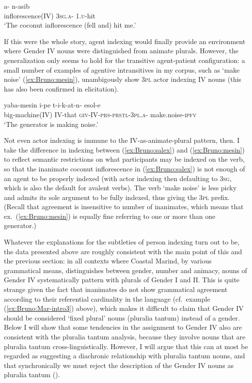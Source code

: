 \documentclass[output=collectionpaper]{langsci/langscibook}
\begin{document}
\ea\label{ex:Bruno:salex}
 a- n-asib\\
inflorescence(IV) 3\textsc{sg}.\textsc{a}- 1.\textsc{u}-hit\\
\glt `The coconut inflorescence (fell and) hit me.'
\z

\noindent If this were the whole story, agent indexing would finally provide an environment where Gender IV nouns were distinguished from animate plurals. However, the generalization only seems to hold for the transitive agent-patient configuration: a small number of examples of agentive intransitives in my corpus, such as  `make noise' (\ref{ex:Bruno:mesin}), unambigously show 3\textsc{pl} actor indexing IV nouns (this has also been confirmed in elicitation).

\ea\label{ex:Bruno:mesin}
\gll yaba-mesin i-pe t-i-k-at-n- esol-e\\
big-machine(IV) IV-that \textsc{giv}-IV-\textsc{prs}-\textsc{prstl}-3\textsc{pl}.\textsc{a}- make.noise-\textsc{ipfv} \\
\glt `The generator is making noise.'
\z

\noindent Not even actor indexing is immune to the IV-as-animate-plural pattern, then. I take the difference in indexing between (\ref{ex:Bruno:salex}) and (\ref{ex:Bruno:mesin}) to reflect semantic restrictions on what participants may be indexed on the verb, so that the inanimate coconut inflorescence in (\ref{ex:Bruno:salex}) is not enough of an agent to be properly indexed (with actor indexing then defaulting to 3\textsc{sg}, which is also the default for avalent verbs). The verb  `make noise' is less picky and admits its sole argument to be fully indexed, thus giving the 3\textsc{pl} prefix. (Recall that agreement is insensitive to number of inanimates, which means that ex.~(\ref{ex:Bruno:mesin}) is equally fine referring to one or more than one generator.)

Whatever the explanations for the subtleties of person indexing turn out to be, the data presented above are roughly consistent with the main point of this and the previous section: in all contexts where Coastal Marind, by various grammatical means, distinguishes between gender, number and animacy, nouns of Gender IV systematically pattern with plurals of Gender I and II. This is quite strange given the fact that inanimates do not show grammatical agreement according to their referential cardinality in the language (cf.\ example (\ref{ex:Bruno:Mar-intro3}) above), which makes it difficult to claim that Gender IV should be considered `fixed plural' nouns (pluralia tantum) instead of a gender. Below I will show that some tendencies in the assignment to Gender IV also are consistent with the pluralia tantum analysis, because they involve nouns that are pluralia tantum cross-linguistically. However, I will argue that this can at most be regarded as suggesting a diachronic relationship with pluralia tantum nouns, and that synchronically we must reject the description of the Gender IV nouns as pluralia tantum ().
\end{document}
